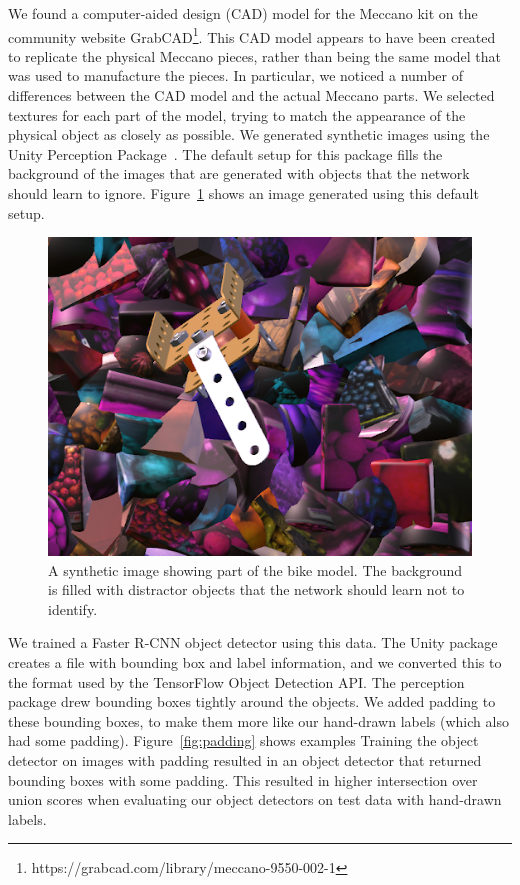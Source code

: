 We found a computer-aided design (CAD) model for the Meccano kit on the
community website
GrabCAD\footnote{https://grabcad.com/library/meccano-9550-002-1}.
This CAD model appears to have been created to replicate the physical Meccano
pieces, rather than being the same model that was used to manufacture the
pieces.
In particular, we noticed a number of differences between the CAD model and the
actual Meccano parts.
We selected textures for each part of the model, trying to match the
appearance of the physical object as closely as possible.
We generated synthetic images using the Unity Perception Package~\cite{unity}.
The default setup for this package fills the background of the images that are
generated with objects that the network should learn to ignore.
Figure~\ref{fig:perception_default} shows an image generated using this default
setup.

\begin{figure}
  \includegraphics[width=\columnwidth]{figures/synthetic/perception_default.png}
  \caption{
    A synthetic image showing part of the bike model. The background is filled
    with distractor objects that the network should learn not to identify.
  }\label{fig:perception_default}
\end{figure}

We trained a Faster R-CNN object detector using this data.
The Unity package creates a file with bounding box and label information, and
we converted this to the format used by the TensorFlow Object Detection API.
The perception package drew bounding boxes tightly around the objects.
We added padding to these bounding boxes, to make them more like our hand-drawn
labels (which also had some padding).
Figure~\ref{fig:padding} shows examples
Training the object detector on images with padding resulted in an object
detector that returned bounding boxes with some padding.
This resulted in higher intersection over union scores when evaluating our
object detectors on test data with hand-drawn labels.

